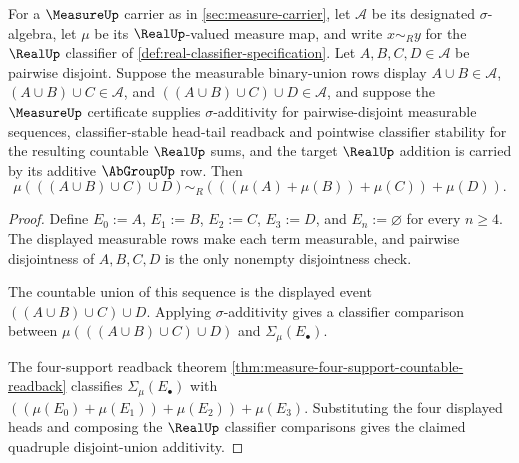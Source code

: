 \begin{theorem}
\label{thm:measure-quadruple-disjoint-union-additivity}
For a $\MeasureUp$ carrier as in \autoref{sec:measure-carrier}, let
$\mathcal{A}$ be its designated $\sigma$-algebra, let $\mu$ be its
$\RealUp$-valued measure map, and write $x\sim_R y$ for the $\RealUp$
classifier of \autoref{def:real-classifier-specification}. Let
$A,B,C,D\in\mathcal{A}$ be pairwise disjoint. Suppose the measurable
binary-union rows display $A\cup B\in\mathcal{A}$,
$(A\cup B)\cup C\in\mathcal{A}$, and $((A\cup B)\cup C)\cup D\in\mathcal{A}$,
and suppose the $\MeasureUp$ certificate supplies $\sigma$-additivity for
pairwise-disjoint measurable sequences, classifier-stable head-tail readback
and pointwise classifier stability for the resulting countable $\RealUp$
sums, and the target $\RealUp$ addition is carried by its additive
$\AbGroupUp$ row. Then
$$
\mu(((A\cup B)\cup C)\cup D)\sim_R(((\mu(A)+\mu(B))+\mu(C))+\mu(D)).
$$
\end{theorem}
\begin{proof}
Define $E_0:=A$, $E_1:=B$, $E_2:=C$, $E_3:=D$, and
$E_n:=\varnothing$ for every $n\geq4$. The displayed measurable rows make
each term measurable, and pairwise disjointness of $A,B,C,D$ is the only
nonempty disjointness check.

The countable union of this sequence is the displayed event
$((A\cup B)\cup C)\cup D$. Applying $\sigma$-additivity gives a classifier
comparison between $\mu(((A\cup B)\cup C)\cup D)$ and
$\Sigma_\mu(E_\bullet)$.

The four-support readback theorem
\autoref{thm:measure-four-support-countable-readback} classifies
$\Sigma_\mu(E_\bullet)$ with
$((\mu(E_0)+\mu(E_1))+\mu(E_2))+\mu(E_3)$. Substituting the four displayed
heads and composing the $\RealUp$ classifier comparisons gives the claimed
quadruple disjoint-union additivity.
\end{proof}

